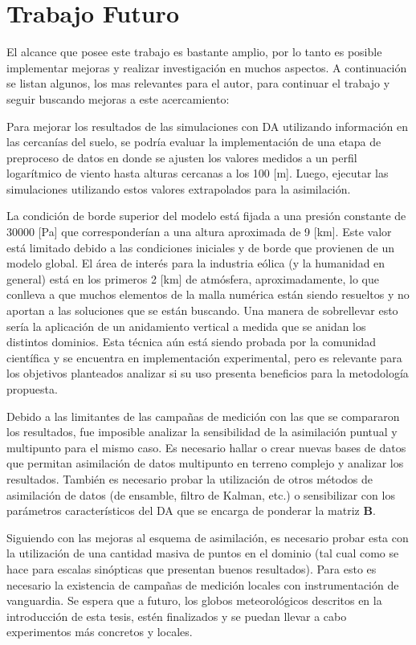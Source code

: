 \section{Trabajo Futuro}
El alcance que posee este trabajo es bastante amplio, por lo tanto es posible implementar mejoras y realizar investigación en muchos aspectos. A continuación se listan algunos, los mas relevantes para el autor, para continuar el trabajo y seguir buscando mejoras a este acercamiento:
\begin{itemize*}
	\item Para mejorar los resultados de las simulaciones con DA utilizando información en las cercanías del suelo, se podría evaluar la implementación de una etapa de preproceso de datos en donde se ajusten los valores medidos a un perfil logarítmico de viento hasta alturas cercanas a los 100 [m]. Luego, ejecutar las simulaciones utilizando estos valores extrapolados para la asimilación.
	\item La condición de borde superior del modelo está fijada a una presión constante de $30000$ [Pa] que corresponderían a una altura aproximada de 9 [km]. Este valor está limitado debido a las condiciones iniciales y de borde que provienen de un modelo global. El área de interés para la industria eólica (y la humanidad en general) está en los primeros 2 [km] de atmósfera, aproximadamente, lo que conlleva a que muchos elementos de la malla numérica están siendo resueltos y no aportan a las soluciones que se están buscando. Una manera de sobrellevar esto sería la aplicación de un anidamiento vertical a medida que se anidan los distintos dominios. Esta técnica aún está siendo probada por la comunidad científica y se encuentra en implementación experimental, pero es relevante para los objetivos planteados analizar si su uso presenta beneficios para la metodología propuesta.
	\item Debido a las limitantes de las campañas de medición con las que se compararon los resultados, fue imposible analizar la sensibilidad de la asimilación puntual y multipunto para el mismo caso. Es necesario hallar o crear nuevas bases de datos que permitan asimilación de datos multipunto en terreno complejo y analizar los resultados. También es necesario probar la utilización de otros métodos de asimilación de datos (de ensamble, filtro de Kalman, etc.) o sensibilizar con los parámetros característicos del DA que se encarga de ponderar la matriz $\textbf{B}$.
	\item Siguiendo con las mejoras al esquema de asimilación, es necesario probar esta con la utilización de una cantidad masiva de puntos en el dominio (tal cual como se hace para escalas sinópticas que presentan buenos resultados). Para esto es necesario la existencia de campañas de medición locales con instrumentación de vanguardia. Se espera que a futuro, los globos meteorológicos descritos en la introducción de esta tesis, estén finalizados y se puedan llevar a cabo experimentos más concretos y locales.

\end{itemize*}

